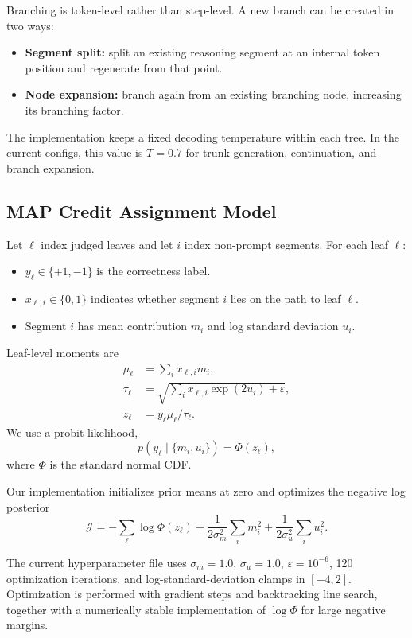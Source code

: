 \documentclass{article}
\begin{document}
Branching is token-level rather than step-level. A new branch can be created in two ways:
\begin{itemize}
    \item \textbf{Segment split:} split an existing reasoning segment at an internal token position and regenerate from that point.
    \item \textbf{Node expansion:} branch again from an existing branching node, increasing its branching factor.
\end{itemize}

The implementation keeps a fixed decoding temperature within each tree. In the current configs, this value is $T=0.7$ for trunk generation, continuation, and branch expansion.

\subsection{MAP Credit Assignment Model}
Let $\ell$ index judged leaves and let $i$ index non-prompt segments. For each leaf $\ell$:
\begin{itemize}
    \item $y_\ell \in \{+1,-1\}$ is the correctness label.
    \item $x_{\ell,i} \in \{0,1\}$ indicates whether segment $i$ lies on the path to leaf $\ell$.
    \item Segment $i$ has mean contribution $m_i$ and log standard deviation $u_i$.
\end{itemize}

Leaf-level moments are
\begin{align}
\mu_\ell &= \sum_i x_{\ell,i} m_i, \\
\tau_\ell &= \sqrt{\sum_i x_{\ell,i} \exp(2u_i) + \varepsilon}, \\
z_\ell &= y_\ell \mu_\ell / \tau_\ell.
\end{align}
We use a probit likelihood,
\begin{equation}
p(y_\ell \mid \{m_i,u_i\}) = \Phi(z_\ell),
\end{equation}
where $\Phi$ is the standard normal CDF.

Our implementation initializes prior means at zero and optimizes the negative log posterior
\begin{equation}
\mathcal{J} = -\sum_\ell \log \Phi(z_\ell)
+ \frac{1}{2\sigma_m^2}\sum_i m_i^2
+ \frac{1}{2\sigma_u^2}\sum_i u_i^2.
\end{equation}

The current hyperparameter file uses
$\sigma_m = 1.0$,
$\sigma_u = 1.0$,
$\varepsilon = 10^{-6}$,
120 optimization iterations, and log-standard-deviation clamps in $[-4,2]$.
Optimization is performed with gradient steps and backtracking line search, together with a numerically stable implementation of $\log \Phi$ for large negative margins.
\end{document}
